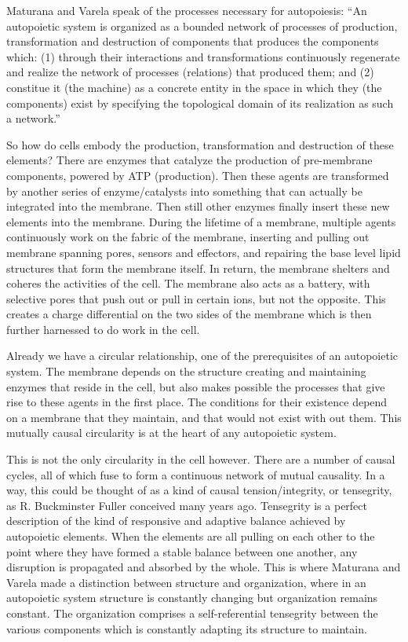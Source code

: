 \documentclass[12pt]{scrartcl}
\begin{document}
Maturana and Varela speak of the processes necessary for autopoiesis:  ``An autopoietic system is organized as a bounded network of processes of production, transformation and destruction of components that produces the components which: (1) through their interactions and transformations continuously regenerate and realize the network of processes (relations) that produced them;  and (2) constitue it (the machine) as a concrete entity in the space in which they (the components) exist by specifying the topological domain of its realization as such a network.'' \cite{Maturana}

So how do cells embody the production, transformation and destruction of these elements?  There are enzymes that catalyze the production of pre-membrane components, powered by ATP (production).  Then these agents are transformed by another series of enzyme/catalysts into something that can actually be integrated into the membrane.  Then still other enzymes finally insert these new elements into the membrane.  During the lifetime of a membrane, multiple agents continuously work on the fabric of the membrane, inserting and pulling out membrane spanning pores, sensors and effectors, and repairing the base level lipid structures that form the membrane itself.  In return, the membrane shelters and coheres the activities of the cell.  The membrane also acts as a battery, with selective pores that push out or pull in certain ions, but not the opposite.  This creates a charge differential on the two sides of the membrane which is then further harnessed to do work in the cell.  

Already we have a circular relationship, one of the prerequisites of an autopoietic system.  The membrane depends on the structure creating and maintaining enzymes that reside in the cell, but also makes possible the processes that give rise to these agents in the first place.  The conditions for their existence depend on a membrane that they maintain, and that would not exist with out them.  This mutually causal circularity is at the heart of any autopoietic system.  

This is not the only circularity in the cell however.  There are a number of causal cycles, all of which fuse to form a continuous network of mutual causality.  In a way, this could be thought of as a kind of causal tension/integrity, or tensegrity, as R. Buckminster Fuller conceived many years ago.  Tensegrity is a perfect description of the kind of responsive and adaptive balance achieved by autopoietic elements.  When the elements are all pulling on each other to the point where they have formed a stable balance between one another, any disruption is propagated and absorbed by the whole.  This is where Maturana and Varela made a distinction between structure and organization, where in an autopoietic system structure is constantly changing but organization remains constant.  The organization comprises a self-referential tensegrity between the various components which is constantly adapting its structure to maintain.  
\end{document}
